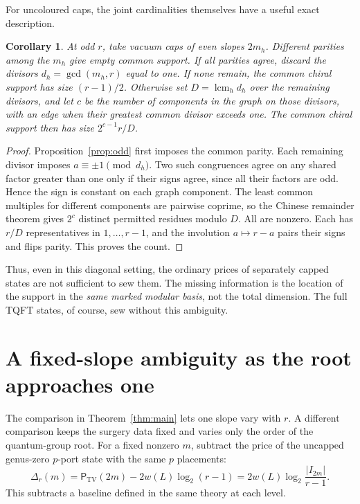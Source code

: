 \documentclass[11pt]{article}
\newtheorem{corollary}[theorem]{Corollary}
\theoremstyle{remark}
\DeclareMathOperator{\lcm}{lcm}
\newcommand{\TV}{\mathrm{TV}}
\newcommand{\TVprice}{\mathsf{P}}
\begin{document}
For uncoloured caps, the joint cardinalities themselves have a useful exact description.
\begin{corollary}\label{cor:crt}
At odd \(r\), take vacuum caps of even slopes \(2m_h\). Different parities among the \(m_h\) give empty common support. If all parities agree, discard the divisors \(d_h=\gcd(m_h,r)\) equal to one. If none remain, the common chiral support has size \((r-1)/2\). Otherwise set \(D=\lcm_h d_h\) over the remaining divisors, and let \(c\) be the number of components in the graph on those divisors, with an edge when their greatest common divisor exceeds one. The common chiral support then has size \(2^{c-1}r/D\).
\end{corollary}
\begin{proof}
Proposition~\ref{prop:odd} first imposes the common parity. Each remaining divisor imposes \(a\equiv\pm1\pmod{d_h}\). Two such congruences agree on any shared factor greater than one only if their signs agree, since all their factors are odd. Hence the sign is constant on each graph component. The least common multiples for different components are pairwise coprime, so the Chinese remainder theorem gives \(2^c\) distinct permitted residues modulo \(D\). All are nonzero. Each has \(r/D\) representatives in \(1,\ldots,r-1\), and the involution \(a\mapsto r-a\) pairs their signs and flips parity. This proves the count.
\end{proof}

Thus, even in this diagonal setting, the ordinary prices of separately capped states are not sufficient to sew them. The missing information is the location of the support in the \emph{same marked modular basis}, not the total dimension. The full TQFT states, of course, sew without this ambiguity.

\section{A fixed-slope ambiguity as the root approaches one}\label{sec:root}

The comparison in Theorem~\ref{thm:main} lets one slope vary with \(r\). A different comparison keeps the surgery data fixed and varies only the order of the quantum-group root. For a fixed nonzero \(m\), subtract the price of the uncapped genus-zero \(p\)-port state with the same \(p\) placements:
\begin{equation}\label{eq:renorm}
 \Delta_r(m)=\TVprice_{\TV}(2m)-2w(L)\log_2(r-1)
 =2w(L)\log_2\frac{|I_{2m}|}{r-1}.
\end{equation}
This subtracts a baseline defined in the same theory at each level.
\end{document}
